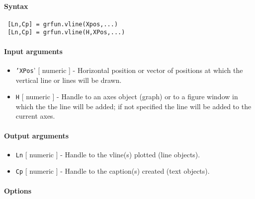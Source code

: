 


	\paragraph{Syntax}
 
 \begin{verbatim}
 [Ln,Cp] = grfun.vline(Xpos,...)
 [Ln,Cp] = grfun.vline(H,XPos,...)
 \end{verbatim}
 
 \paragraph{Input arguments}
 
 \begin{itemize}
 \item
   \texttt{'XPos}' {[} numeric {]} - Horizontal position or vector of
   positions at which the vertical line or lines will be drawn.
 \item
   \texttt{H} {[} numeric {]} - Handle to an axes object (graph) or to a
   figure window in which the the line will be added; if not specified
   the line will be added to the current axes.
 \end{itemize}
 
 \paragraph{Output arguments}
 
 \begin{itemize}
 \item
   \texttt{Ln} {[} numeric {]} - Handle to the vline(s) plotted (line
   objects).
 \item
   \texttt{Cp} {[} numeric {]} - Handle to the caption(s) created (text
   objects).
 \end{itemize}
 
 \paragraph{Options}
 

